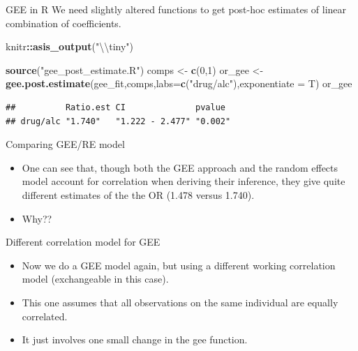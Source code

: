 \documentclass[ignorenonframetext,]{beamer}
\newenvironment{Shaded}{\begin{snugshade}}{\end{snugshade}}
\newcommand{\KeywordTok}[1]{\textcolor[rgb]{0.13,0.29,0.53}{\textbf{#1}}}
\newcommand{\DataTypeTok}[1]{\textcolor[rgb]{0.13,0.29,0.53}{#1}}
\newcommand{\DecValTok}[1]{\textcolor[rgb]{0.00,0.00,0.81}{#1}}
\newcommand{\CharTok}[1]{\textcolor[rgb]{0.31,0.60,0.02}{#1}}
\newcommand{\StringTok}[1]{\textcolor[rgb]{0.31,0.60,0.02}{#1}}
\newcommand{\OperatorTok}[1]{\textcolor[rgb]{0.81,0.36,0.00}{\textbf{#1}}}
\newcommand{\NormalTok}[1]{#1}
\begin{document}
\begin{frame}[fragile]{GEE in R}
We need slightly altered functions to get post-hoc estimates of linear
combination of coefficients.

\begin{Shaded}
\begin{Highlighting}[]
\NormalTok{knitr}\OperatorTok{::}\KeywordTok{asis_output}\NormalTok{(}\StringTok{"}\CharTok{\textbackslash{}\textbackslash{}}\StringTok{tiny"}\NormalTok{)}
\end{Highlighting}
\end{Shaded}

\tiny

\begin{Shaded}
\begin{Highlighting}[]
\KeywordTok{source}\NormalTok{(}\StringTok{"gee_post_estimate.R"}\NormalTok{)}
\NormalTok{comps <-}\StringTok{ }\KeywordTok{c}\NormalTok{(}\DecValTok{0}\NormalTok{,}\DecValTok{1}\NormalTok{)}
\NormalTok{or_gee <-}\StringTok{ }\KeywordTok{gee.post.estimate}\NormalTok{(gee_fit,comps,}\DataTypeTok{labs=}\KeywordTok{c}\NormalTok{(}\StringTok{"drug/alc"}\NormalTok{),}\DataTypeTok{exponentiate =}\NormalTok{ T)            }
\NormalTok{or_gee}
\end{Highlighting}
\end{Shaded}

\begin{verbatim}
##          Ratio.est CI              pvalue 
## drug/alc "1.740"   "1.222 - 2.477" "0.002"
\end{verbatim}

\end{frame}

\begin{frame}{Comparing GEE/RE model}

\begin{itemize}
\item
  One can see that, though both the GEE approach and the random effects
  model account for correlation when deriving their inference, they give
  quite different estimates of the the OR (1.478 versus 1.740).
\item
  Why??
\end{itemize}

\end{frame}

\begin{frame}{Different correlation model for GEE}

\begin{itemize}
\item
  Now we do a GEE model again, but using a different working correlation
  model (exchangeable in this case).
\item
  This one assumes that all observations on the same individual are
  equally correlated.
\item
  It just involves one small change in the gee function.
\end{itemize}

\end{frame}
\end{document}
